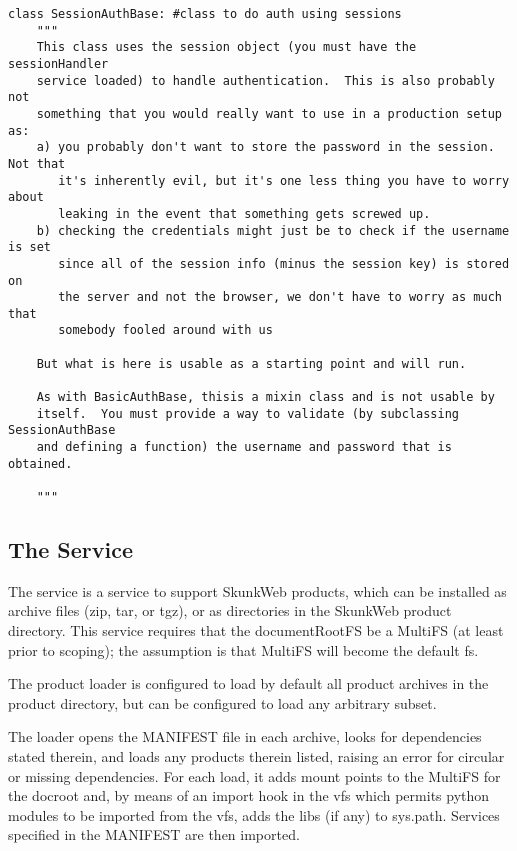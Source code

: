 \documentclass{manual}
\begin{document}
\begin{verbatim}
class SessionAuthBase: #class to do auth using sessions
    """
    This class uses the session object (you must have the sessionHandler
    service loaded) to handle authentication.  This is also probably not 
    something that you would really want to use in a production setup as:
    a) you probably don't want to store the password in the session.  Not that
       it's inherently evil, but it's one less thing you have to worry about
       leaking in the event that something gets screwed up.
    b) checking the credentials might just be to check if the username is set
       since all of the session info (minus the session key) is stored on
       the server and not the browser, we don't have to worry as much that
       somebody fooled around with us

    But what is here is usable as a starting point and will run.

    As with BasicAuthBase, thisis a mixin class and is not usable by
    itself.  You must provide a way to validate (by subclassing SessionAuthBase
    and defining a function) the username and password that is obtained.

    """
\end{verbatim}



\subsection{The  Service}
The  service is a service to support SkunkWeb
products, which can be installed as archive files (zip, tar, or tgz),
or as directories in the SkunkWeb product directory.  This service
requires that the documentRootFS be a MultiFS (at least prior to
scoping); the assumption is that MultiFS will become the default fs.

The product loader is configured to load by default all product
archives in the product directory, but can be configured to load any
arbitrary subset.

The loader opens the MANIFEST file in each archive, looks for
dependencies stated therein, and loads any products therein listed,
raising an error for circular or missing dependencies.  For each load,
it adds mount points to the MultiFS for the docroot and, by means of
an import hook in the vfs which permits python modules to be imported
from the vfs, adds the libs (if any) to sys.path.  Services specified
in the MANIFEST are then imported.
\end{document}
